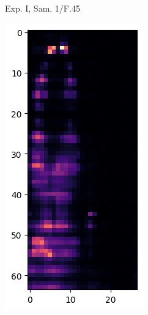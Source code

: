 \documentclass[10pt]{article}
\begin{document}
\begin{figure}[!h]
\begin{subfigure}{0.3\textwidth}
      \caption{Exp. I, Sam. 1/F.45}
    \end{subfigure}
    \hfill
    \begin{subfigure}{0.3\textwidth}
      \centering
      \includegraphics[width=\linewidth]{./EII_AirMat_B1.png}

\end{subfigure}
\end{figure}
\end{document}
